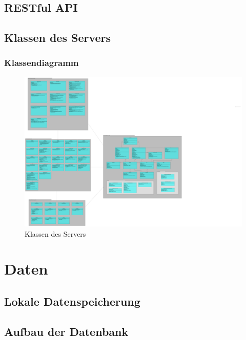 \documentclass[a4paper]{scrreprt}
\begin{document}
	\clearpage
	
	\clearpage
	
	\clearpage
	
	\clearpage
	\section{RESTful API}
	
	\clearpage
	\section{Klassen des Servers}
		\subsection{Klassendiagramm}
		\begin{figure}[H]
	       \centering
	       \includegraphics[scale = .05]{server-packages.png}
	       \caption{Klassen des Servers}
	      \end{figure}

	
 

\chapter{Daten}
	\section{Lokale Datenspeicherung}
			
	\section{Aufbau der Datenbank}
			
			
\end{document}
